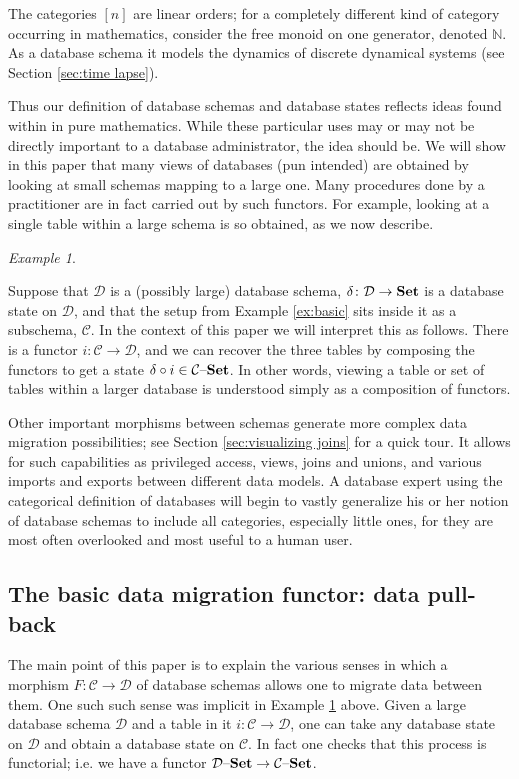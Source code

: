 \documentclass{amsart}
\def\mc{\mathcal}
\def\NN{{\mathbb N}}
\def\to{\rightarrow}
\def\taking{\colon}
\def\Set{{\bf Set}}
\def\set{{\text \textendash}{\bf Set}}
\def\mcC{\mc{C}}
\def\mcD{\mc{D}}
\theoremstyle{remark}
\newtheorem{example}[theorem]{Example}
\theoremstyle{definition}
\begin{document}
The categories $[n]$ are linear orders; for a completely different kind of category occurring in mathematics, consider the free monoid on one generator, denoted $\NN$.  As a database schema it models the dynamics of discrete dynamical systems (see Section \ref{sec:time lapse}).

Thus our definition of database schemas and database states reflects ideas found within in pure mathematics.  While these particular uses may or may not be directly important to a database administrator, the idea should be.  We will show in this paper that many views of databases (pun intended) are obtained by looking at small schemas mapping to a large one.   Many procedures done by a practitioner are in fact carried out by such functors.  For example, looking at a single table within a large schema is so obtained, as we now describe.

\begin{example}\label{ex:one table}

Suppose that $\mcD$ is a (possibly large) database schema, $\delta\taking\mcD\to\Set$ is a database state on $\mcD$, and that the setup from Example \ref{ex:basic} sits inside it as a subschema, $\mcC$.  In the context of this paper we will interpret this as follows.  There is a functor $i\taking\mcC\to\mcD$, and we can recover the three tables by composing the functors to get a state $\delta\circ i\in\mcC\set$.  In other words, viewing a table or set of tables within a larger database is understood simply as a composition of functors.

\end{example}

Other important morphisms between schemas generate more complex data migration possibilities; see Section \ref{sec:visualizing joins} for a quick tour.  It allows for such capabilities as privileged access, views, joins and unions, and various imports and exports between different data models.  A database expert using the categorical definition of databases will begin to vastly generalize his or her notion of database schemas to include all categories, especially little ones, for they are most often overlooked and most useful to a human user.

\subsection{The basic data migration functor: data pull-back}

The main point of this paper is to explain the various senses in which a morphism $F\taking\mcC\to\mcD$ of database schemas allows one to migrate data between them.  One such such sense was implicit in Example \ref{ex:one table} above.  Given a large database schema $\mcD$ and a table in it $i\taking\mcC\to\mcD$, one can take any database state on $\mcD$ and obtain a database state on $\mcC$.  In fact one checks that this process is functorial; i.e. we have a functor $\mcD\set\to\mcC\set$.  
\end{document}

